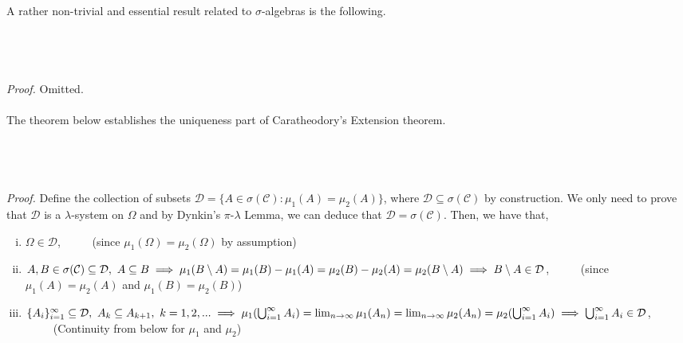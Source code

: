 \documentclass{article}
\begin{document}
A rather non-trivial and essential result related to $\sigma$-algebras is the following.\\\\
\noindent{}\\\\\\
\textit{Proof.} Omitted.\\\\
The theorem below establishes the uniqueness part of Caratheodory's Extension theorem.\\\\
\noindent{}\\\\\\
\textit{Proof.} Define the collection of subsets $\mathcal{D} = \{A \in \sigma(\mathcal{C}): \mu_1(A) = \mu_2(A)\}$, where $\mathcal{D} \subseteq \sigma(\mathcal{C})$ by construction. We only need to prove that $\mathcal{D}$ is a $\lambda$-system on $\Omega$ and by Dynkin's $\pi$-$\lambda$ Lemma, we can deduce that $\mathcal{D} = \sigma(\mathcal{C})$. Then, we have that,
\begin{enumerate}[(i)]
	\item $\Omega \in \mathcal{D}$, \ \ \ \ \ (since $\mu_1(\Omega) = \mu_2(\Omega)$ by assumption)
	\item $A, B \in \sigma(\mathcal{C}) \subseteq \mathcal{D}, \ A \subseteq B \implies \mu_1(B \setminus A) = \mu_1(B) - \mu_1(A) = \mu_2(B) - \mu_2(A) = \mu_2(B \setminus A) \\ \implies B \setminus A \in \mathcal{D}$, \ \ \ \ \ (since $\mu_1(A) = \mu_2(A)$ and $\mu_1(B) = \mu_2(B)$)
	\item $\{A_i\}_{i=1}^{\infty} \subseteq \mathcal{D}, \ A_k \subseteq A_{k+1}, \ k=1,2,... \\ \implies \mu_1(\bigcup_{i=1}^{\infty}A_i) = \lim_{n \to \infty}\mu_1(A_n) = \lim_{n \to \infty}\mu_2(A_n) = \mu_2(\bigcup_{i=1}^{\infty}A_i) \implies \bigcup_{i=1}^{\infty}A_i \in \mathcal{D}$, \ \ \ \ \ (Continuity from below for $\mu_1$ and $\mu_2$)
\end{enumerate}
\end{document}
